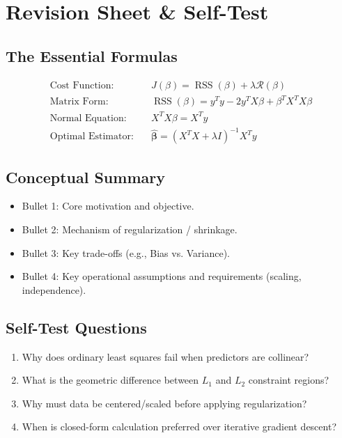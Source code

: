 \documentclass[11pt,a4paper,oneside]{book}
\newcommand{\RSS}{\operatorname{RSS}}
\newcommand{\bhat}{\widehat{\boldsymbol{\beta}}}
\begin{document}
\chapter{Revision Sheet \& Self-Test}

\section{The Essential Formulas}
\begin{align*}
  \text{Cost Function:}\quad& J(\beta) = \RSS(\beta) + \lambda \mathcal{R}(\beta) \\
  \text{Matrix Form:}\quad& \RSS(\beta) = y^Ty - 2y^TX\beta + \beta^TX^TX\beta \\
  \text{Normal Equation:}\quad& X^TX\beta = X^Ty \\
  \text{Optimal Estimator:}\quad& \bhat = (X^TX + \lambda I)^{-1} X^Ty
\end{align*}

\section{Conceptual Summary}
\begin{itemize}
  \item Bullet 1: Core motivation and objective.
  \item Bullet 2: Mechanism of regularization / shrinkage.
  \item Bullet 3: Key trade-offs (e.g., Bias vs. Variance).
  \item Bullet 4: Key operational assumptions and requirements (scaling, independence).
\end{itemize}

\section{Self-Test Questions}
\begin{enumerate}
  \item Why does ordinary least squares fail when predictors are collinear?
  \item What is the geometric difference between $L_1$ and $L_2$ constraint regions?
  \item Why must data be centered/scaled before applying regularization?
  \item When is closed-form calculation preferred over iterative gradient descent?
\end{enumerate}
\end{document}
